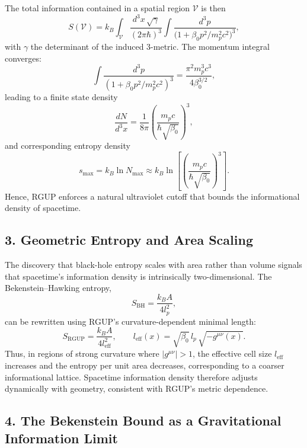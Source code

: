 \documentclass[11pt,oneside]{book}
\numberwithin{equation}{chapter}
\newcommand{\betaz}{\beta_0}
\begin{document}
The total information contained in a spatial region $\mathcal{V}$ is then
\begin{equation}
S(\mathcal{V}) = 
k_B\!\int_\mathcal{V} \frac{d^3x\,\sqrt{\gamma}}{(2\pi\hbar)^3}
\int \frac{d^3p}{
\big(1+\betaz p^2/m_p^2 c^2\big)^3},
\end{equation}
with $\gamma$ the determinant of the induced 3-metric.  
The momentum integral converges:
\begin{equation}
\int \frac{d^3p}{
(1+\betaz p^2/m_p^2 c^2)^3}
= \frac{\pi^2 m_p^3 c^3}{4\betaz^{3/2}},
\end{equation}
leading to a finite state density
\begin{equation}
\frac{dN}{d^3x} =
\frac{1}{8\pi}\!
\left(\frac{m_p c}{\hbar\sqrt{\betaz}}\right)^{\!3},
\end{equation}
and corresponding entropy density
\begin{equation}
s_{\max} = k_B \ln N_{\max}
\approx k_B \ln
\!\left[\left(\frac{m_p c}{\hbar\sqrt{\betaz}}\right)^{\!3}\right].
\end{equation}
Hence, RGUP enforces a natural ultraviolet cutoff that bounds the informational density of spacetime.

\subsection*{3. Geometric Entropy and Area Scaling}

The discovery that black-hole entropy scales with area rather than volume signals that spacetime’s information density is intrinsically two-dimensional.  
The Bekenstein–Hawking entropy,
\begin{equation}
S_{\text{BH}} = \frac{k_B A}{4l_p^2},
\end{equation}
can be rewritten using RGUP’s curvature-dependent minimal length:
\begin{equation}
S_{\text{RGUP}} = 
\frac{k_B A}{4 l_{\text{eff}}^2},
\qquad
l_{\text{eff}}(x) = \sqrt{\betaz}\,l_p\,\sqrt{-g^{\mu\nu}(x)}.
\end{equation}
Thus, in regions of strong curvature where $|g^{\mu\nu}|\!>\!1$, the effective cell size $l_{\text{eff}}$ increases and the entropy per unit area decreases, corresponding to a coarser informational lattice.  
Spacetime information density therefore adjusts dynamically with geometry, consistent with RGUP’s metric dependence.

\subsection*{4. The Bekenstein Bound as a Gravitational Information Limit}
\end{document}
